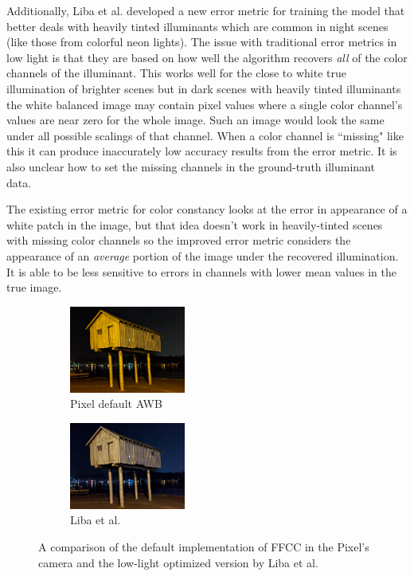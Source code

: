 \documentclass{sig-alternate}
\begin{document}
Additionally, Liba et al. developed a new error metric for training the model that better deals with heavily tinted illuminants which are common in night scenes (like those from colorful neon lights). The issue with traditional error metrics in low light is that they are based on how well the algorithm recovers \emph{all} of the color channels of the illuminant. This works well for the close to white true illumination of brighter scenes but in dark scenes with heavily tinted illuminants the white balanced image may contain pixel values where a single color channel's values are near zero for the whole image. Such an image would look the same under all possible scalings of that channel. When a color channel is ``missing" like this it can produce inaccurately low accuracy results from the error metric. It is also unclear how to set the missing channels in the ground-truth illuminant data.~\cite{Liba2019}

The existing error metric for color constancy looks at the error in appearance of a white patch in the image, but that idea doesn't work in heavily-tinted scenes with missing color channels so the improved error metric considers the appearance of an \emph{average} portion of the image under the recovered illumination. It is able to be less sensitive to errors in channels with lower mean values in the true image.~\cite{Liba2019}


\begin{figure}
\centering
\begin{subfigure}{1.5in}
\centering
\includegraphics[width=1.5in]{figures/0GMA_20180814_233948_174_qc.jpg}
\caption{Pixel default AWB}
\label{fig:whitebalance:default}
\end{subfigure}
\begin{subfigure}{1.5in}
\centering
\includegraphics[width=1.5in]{figures/0GMA_20180814_233948_174_gcam.jpg}
\caption{Liba et al.}
\label{fig:whitebalance:liba}
\end{subfigure}

\caption{A comparison of the default implementation of FFCC in the Pixel's camera and the low-light optimized version by Liba et al.~\cite{blog:Levoy2018}}


\label{fig:whitebalance}
\end{figure}
\end{document}
